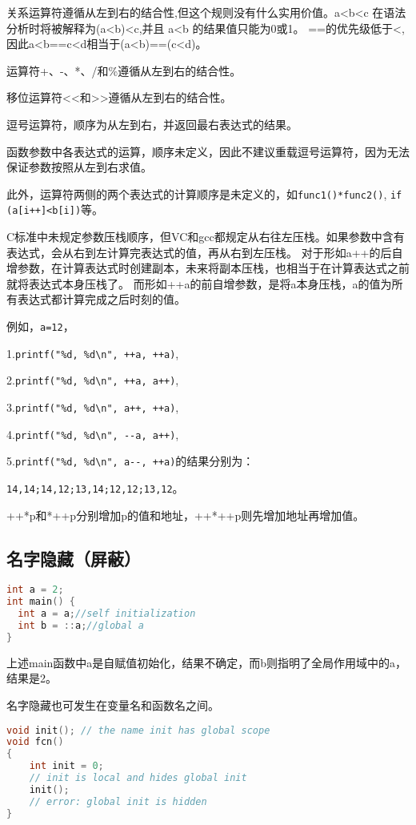 关系运算符遵循从左到右的结合性,但这个规则没有什么实用价值。a<b<c 在语法分析时将被解释为(a<b)<c,并且 a<b 的结果值只能为0或1。
==的优先级低于<,因此a<b==c<d相当于(a<b)==(c<d)。

运算符+、-、*、/和\%遵循从左到右的结合性。

移位运算符<<和>>遵循从左到右的结合性。

逗号运算符，顺序为从左到右，并返回最右表达式的结果。

函数参数中各表达式的运算，顺序未定义，因此不建议重载逗号运算符，因为无法保证参数按照从左到右求值。

此外，运算符两侧的两个表达式的计算顺序是未定义的，如\verb|func1()*func2()|, \verb|if (a[i++]<b[i])|等。

C标准中未规定参数压栈顺序，但VC和gcc都规定从右往左压栈。如果参数中含有表达式，会从右到左计算完表达式的值，再从右到左压栈。
对于形如a++的后自增参数，在计算表达式时创建副本，未来将副本压栈，也相当于在计算表达式之前就将表达式本身压栈了。
而形如++a的前自增参数，是将a本身压栈，a的值为所有表达式都计算完成之后时刻的值。

例如，\verb|a=12|，

1.\verb|printf("%d, %d\n", ++a, ++a)|,

2.\verb|printf("%d, %d\n", ++a, a++)|,

3.\verb|printf("%d, %d\n", a++, ++a)|,

4.\verb|printf("%d, %d\n", --a, a++)|,

5.\verb|printf("%d, %d\n", a--, ++a)|的结果分别为：

\verb|14,14;14,12;13,14;12,12;13,12|。

++*p和*++p分别增加p的值和地址，++*++p则先增加地址再增加值。


\subsection{名字隐藏（屏蔽）}
\begin{lstlisting}[language=C++]
int a = 2;
int main() {
  int a = a;//self initialization
  int b = ::a;//global a
}
\end{lstlisting}

上述main函数中a是自赋值初始化，结果不确定，而b则指明了全局作用域中的a，结果是2。

名字隐藏也可发生在变量名和函数名之间。
\begin{lstlisting}[language=C++]
void init(); // the name init has global scope
void fcn()
{
	int init = 0;
	// init is local and hides global init
	init();
	// error: global init is hidden
}
\end{lstlisting}



